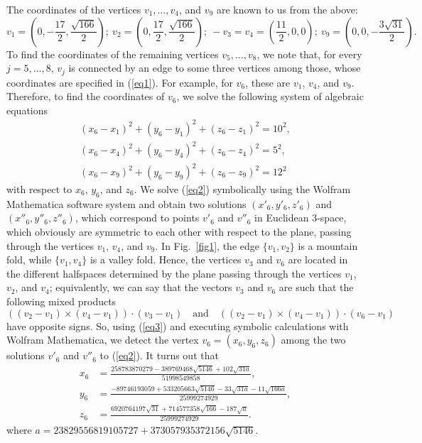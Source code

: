 \documentclass[12pt, reqno]{amsart}
\begin{document}
The coordinates of the vertices 
$v_1, \dots, v_4$, and $v_9$
are known to us from the above:
\begin{equation}\label{eq1}
v_1 = (0, -\frac{17}{2}, \frac{\sqrt{166}}{2}); \ 
v_2 = (0,  \frac{17}{2}, \frac{\sqrt{166}}{2}); \ 
-v_3 = v_4 = (\frac{11}{2}, 0, 0); \ 
v_9 = (0, 0, -\frac{3\sqrt{31}}{2}).
\end{equation}
To find the coordinates of the remaining vertices 
$v_5, \dots, v_8$, 
we note that, for every 
$j=5,\dots, 8$, 
$v_j$ 
is connected by an edge to some three vertices among those, whose coordinates are 
specified in (\ref{eq1}).
For example, for  
$v_6$, 
these are
$v_1$, $v_4$, 
and 
$v_9$.
Therefore, to find the coordinates of 
$v_6$, 
we solve the following system of algebraic equations
\begin{gather}
(x_6-x_1)^2+(y_6-y_1)^2+(z_6-z_1)^2=10^2,\nonumber\\
(x_6-x_4)^2+(y_6-y_4)^2+(z_6-z_4)^2=5^2, \label{eq2}\\
(x_6-x_9)^2+(y_6-y_9)^2+(z_6-z_9)^2=12^2\nonumber
\end{gather}
with respect to 
$x_6$, $y_6$, 
and 
$z_6$.
We solve (\ref{eq2}) symbolically using the Wolfram Mathematica
software system and obtain two solutions 
$(x'_6, y'_6, z'_6)$
and
$(x''_6, y''_6, z''_6)$,
which correspond to points 
$v'_6$ 
and 
$v''_6$ 
in Euclidean 3-space, which obviously are symmetric to each other with respect 
to the plane, passing through the vertices 
$v_1$, $v_4$, 
and 
$v_9$.
In Fig.~\ref{fig1}, the edge 
$\{v_1,v_2\}$
is a mountain fold, while 
$\{v_1,v_4\}$
is a valley fold.
Hence, the vertices
$v_3$ 
and 
$v_6$ 
are located in the different halfspaces determined by the plane passing 
through the vertices
$v_1$, $v_2$, 
and 
$v_4$; 
equivalently, we can say that the vectors
$v_3$ 
and 
$v_6$ 
are such that the following mixed products
\begin{equation}\label{eq3}
((v_2-v_1)\times (v_4-v_1))\cdot (v_3-v_1)
\quad\mbox{and}\quad
((v_2-v_1)\times (v_4-v_1))\cdot (v_6-v_1)
\end{equation}
have opposite signs.
So, using (\ref{eq3}) and executing symbolic calculations 
with Wolfram Mathematica, we detect the vertex
$v_6=(x_6,y_6,z_6)$
among the two  solutions
$v'_6$ 
and 
$v''_6$
to (\ref{eq2}).
It turns out that
\begin{equation}\label{eq4}
\begin{split}
x_6&=\frac{258783870279 -389769468\sqrt{5146}+102\sqrt{31a}}{51998549858},\\  
y_6&=\frac{-89746193059+533205663\sqrt{5146}-33\sqrt{31a} -11\sqrt{166a}}{25999274929},\\
z_6&=\frac{6920764197\sqrt{31}+714577358\sqrt{166} -187\sqrt{a}}{25999274929}.
\end{split}
\end{equation}
where
$a= 23829556819105727+373057935372156\sqrt{5146}.$
\end{document}
